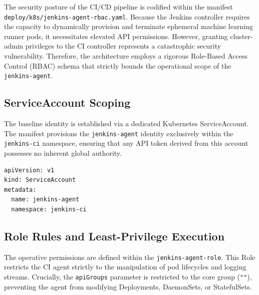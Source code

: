 The security posture of the CI/CD pipeline is codified within the manifest\\\texttt{deploy/k8s/jenkins-agent-rbac.yaml}. Because the Jenkins controller requires the capacity to dynamically provision and terminate ephemeral machine learning runner pods, it necessitates elevated API permissions. However, granting cluster-admin privileges to the CI controller represents a catastrophic security vulnerability. Therefore, the architecture employs a rigorous Role-Based Access Control (RBAC) schema that strictly bounds the operational scope of the \texttt{jenkins-agent}.

\subsection{ServiceAccount Scoping}
The baseline identity is established via a dedicated Kubernetes ServiceAccount. The manifest provisions the \texttt{jenkins-agent} identity exclusively within the \texttt{jenkins-ci} namespace, ensuring that any API token derived from this account possesses no inherent global authority.

\begin{listing}[H]
\begin{verbatim}
apiVersion: v1
kind: ServiceAccount
metadata:
  name: jenkins-agent
  namespace: jenkins-ci
\end{verbatim}
\caption{ServiceAccount definition for the Jenkins ephemeral agents.}
\label{lst:serviceaccount}
\end{listing}

\subsection{Role Rules and Least-Privilege Execution}
The operative permissions are defined within the \texttt{jenkins-agent-role}. This Role restricts the CI agent strictly to the manipulation of pod lifecycles and logging streams. Crucially, the \texttt{apiGroups} parameter is restricted to the core group (\texttt{""}), preventing the agent from modifying Deployments, DaemonSets, or StatefulSets.


